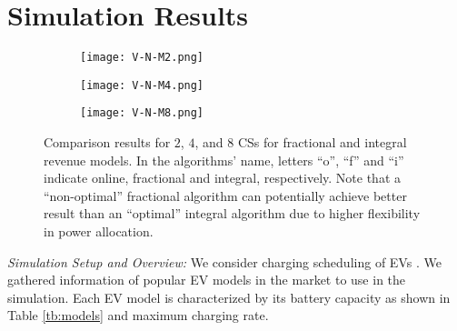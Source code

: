 \section{Simulation Results}
			\label{sec:simul}
			
			
						\begin{figure*}[t]	
				\centering
				\begin{subfigure}[b]{0.25\textwidth}
					\begin{center}
						\texttt{[image: V-N-M2.png]}
						\caption{}
						\label{fig:V-N-M2}
					\end{center}
				\end{subfigure}
				\begin{subfigure}[b]{0.25\textwidth}
					\begin{center}
						\texttt{[image: V-N-M4.png]}
						\caption{}
						\label{fig:V-N-M4}
					\end{center}
				\end{subfigure}%
				\begin{subfigure}[b]{0.25\textwidth}
					\begin{center}
						\texttt{[image: V-N-M8.png]}
						\caption{}
						\label{fig:V-N-M8}
					\end{center}
				\end{subfigure}%
				\caption{Comparison results for $2$, $4$, and $8$ CSs for fractional and integral revenue models. In the algorithms' name, letters ``o'', ``f'' and ``i'' indicate online, fractional and integral, respectively. Note that a ``non-optimal'' fractional algorithm can potentially achieve better result than an ``optimal'' integral algorithm due to higher flexibility in power allocation.}  
				\label{fig:V-N-M}
			\end{figure*}
\textit{Simulation Setup and Overview:} We consider charging scheduling of EVs . 
We gathered information of  popular EV models in the market to use in the simulation. Each EV model is characterized by its battery capacity as shown in Table \ref{tb:models} and maximum charging rate.  
